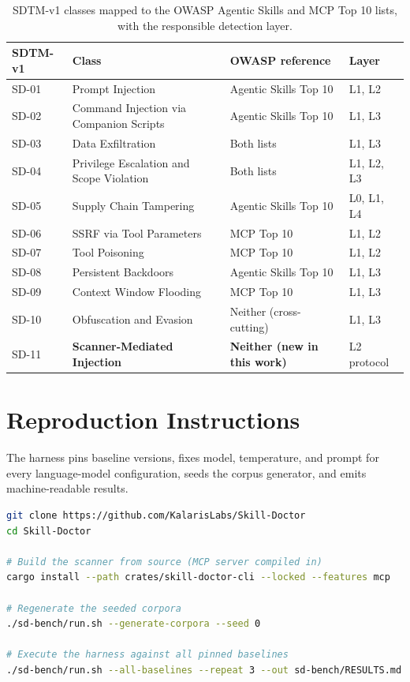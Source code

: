 \documentclass[11pt]{article}
\begin{document}
\begin{table}[htbp]
\centering
\caption{SDTM-v1 classes mapped to the OWASP Agentic Skills and MCP Top 10 lists, with the responsible detection layer.}
\label{tab:owasp}
\small
\begin{tabularx}{\textwidth}{lXll}
\toprule
SDTM-v1 & Class & OWASP reference & Layer \\
\midrule
SD-01 & Prompt Injection & Agentic Skills Top 10 & L1, L2 \\
SD-02 & Command Injection via Companion Scripts & Agentic Skills Top 10 & L1, L3 \\
SD-03 & Data Exfiltration & Both lists & L1, L3 \\
SD-04 & Privilege Escalation and Scope Violation & Both lists & L1, L2, L3 \\
SD-05 & Supply Chain Tampering & Agentic Skills Top 10 & L0, L1, L4 \\
SD-06 & SSRF via Tool Parameters & MCP Top 10 & L1, L2 \\
SD-07 & Tool Poisoning & MCP Top 10 & L1, L2 \\
SD-08 & Persistent Backdoors & Agentic Skills Top 10 & L1, L3 \\
SD-09 & Context Window Flooding & MCP Top 10 & L1, L3 \\
SD-10 & Obfuscation and Evasion & Neither (cross-cutting) & L1, L3 \\
SD-11 & \textbf{Scanner-Mediated Injection} & \textbf{Neither (new in this work)} & L2 protocol \\
\bottomrule
\end{tabularx}
\end{table}

\section{Reproduction Instructions}

The harness pins baseline versions, fixes model, temperature, and prompt for every language-model configuration, seeds the corpus generator, and emits machine-readable results.

\begin{lstlisting}[language=bash,caption={Reproducing the protocol.}]
git clone https://github.com/KalarisLabs/Skill-Doctor
cd Skill-Doctor

# Build the scanner from source (MCP server compiled in)
cargo install --path crates/skill-doctor-cli --locked --features mcp

# Regenerate the seeded corpora
./sd-bench/run.sh --generate-corpora --seed 0

# Execute the harness against all pinned baselines
./sd-bench/run.sh --all-baselines --repeat 3 --out sd-bench/RESULTS.md
\end{lstlisting}
\end{document}
